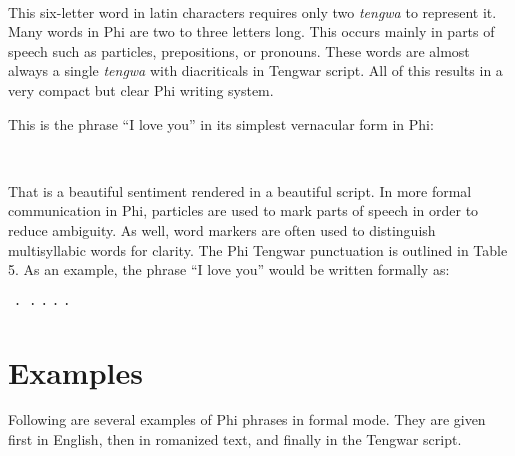 \documentclass[12pt]{report}
\begin{document}
\bigskip
\leftskip=0.66in
\ttbig  \normalfont
\bigskip

\leftskip=0in
This six-letter word in latin characters requires only two \emph{tengwa} to represent it. Many words in Phi are two to three letters long. This occurs mainly in parts of speech such as particles, prepositions, or pronouns. These words are almost always a single \emph{tengwa} with diacriticals in Tengwar script. All of this results in a very compact but clear Phi writing system.

This is the phrase “I love you” in its simplest vernacular form in Phi:

\bigskip
\leftskip=0.66in
\ttbig  \normalfont
\bigskip

\leftskip=0in
That is a beautiful sentiment rendered in a beautiful script. In more formal communication in Phi, particles are used to mark parts of speech in order to reduce ambiguity. As well, word markers are often used to distinguish multisyllabic words for clarity. The Phi Tengwar punctuation is outlined in Table 5. As an example, the phrase “I love you” would be written formally as:

\bigskip
\leftskip=0.66in
\ttbig ⸱⸱⸱⸱⸱ \normalfont
\clearpage
\leftskip=0in
\section{Examples}
Following are several examples of Phi phrases in formal mode. They are given first in English, then in romanized text, and finally in the Tengwar script.
\setlength{\parskip}{1.5em}
\end{document}
